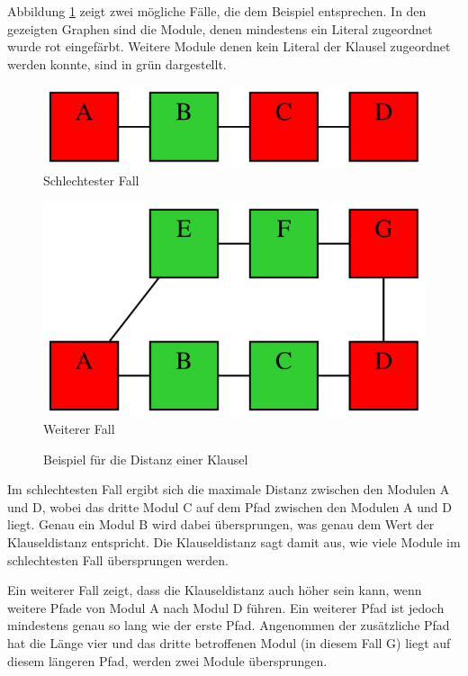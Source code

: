 Abbildung \ref{fig:distance} zeigt zwei mögliche Fälle, die dem Beispiel entsprechen. In den gezeigten Graphen sind die Module, denen mindestens ein Literal
zugeordnet wurde rot eingefärbt. Weitere Module denen kein Literal der Klausel zugeordnet werden konnte, sind in grün dargestellt.
\begin{figure}[!h]
  \centering
  \begin{minipage}[b]{6cm}
    \centering
    \includegraphics[scale=0.6]{images/distance1}\\
    Schlechtester Fall
  \end{minipage}
  \begin{minipage}[b]{6cm}
    \centering
    \includegraphics[scale=0.6]{images/distance2}\\
    Weiterer Fall
  \end{minipage}
  \caption{Beispiel für die Distanz einer Klausel}
  \label{fig:distance}
\end{figure}

Im schlechtesten Fall ergibt sich die maximale Distanz zwischen den Modulen A und D, wobei das dritte Modul C auf dem Pfad zwischen den Modulen A und D liegt.
Genau ein Modul B wird dabei übersprungen, was genau dem Wert der Klauseldistanz entspricht. Die Klauseldistanz sagt damit aus, wie viele Module im schlechtesten
Fall übersprungen werden.

Ein weiterer Fall zeigt, dass die Klauseldistanz auch höher sein kann, wenn weitere Pfade von Modul A nach Modul D führen. Ein weiterer Pfad ist jedoch mindestens
genau so lang wie der erste Pfad. Angenommen der zusätzliche Pfad hat die Länge vier und das dritte betroffenen Modul (in diesem Fall G) liegt auf diesem längeren
Pfad, werden zwei Module übersprungen.

